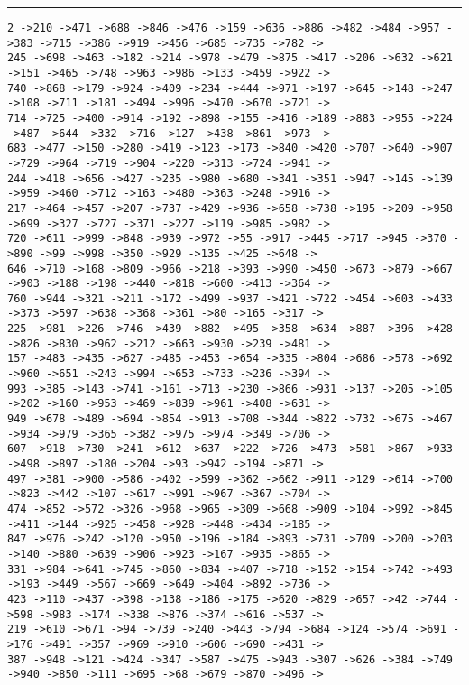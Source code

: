 \documentclass[letter, 12pt]{article}
\newenvironment{question}[1]{%
    \vspace{.2in}%
        \noindent{\bf #1}%
    \vspace{0.3em} \hrule \vspace{.1in}%
}{}
\begin{document}
\begin{question}{\large Appendix}
\begin{lstlisting}[style=CStyle]
2 ->210 ->471 ->688 ->846 ->476 ->159 ->636 ->886 ->482 ->484 ->957 ->383 ->715 ->386 ->919 ->456 ->685 ->735 ->782 ->
245 ->698 ->463 ->182 ->214 ->978 ->479 ->875 ->417 ->206 ->632 ->621 ->151 ->465 ->748 ->963 ->986 ->133 ->459 ->922 ->
740 ->868 ->179 ->924 ->409 ->234 ->444 ->971 ->197 ->645 ->148 ->247 ->108 ->711 ->181 ->494 ->996 ->470 ->670 ->721 ->
714 ->725 ->400 ->914 ->192 ->898 ->155 ->416 ->189 ->883 ->955 ->224 ->487 ->644 ->332 ->716 ->127 ->438 ->861 ->973 ->
683 ->477 ->150 ->280 ->419 ->123 ->173 ->840 ->420 ->707 ->640 ->907 ->729 ->964 ->719 ->904 ->220 ->313 ->724 ->941 ->
244 ->418 ->656 ->427 ->235 ->980 ->680 ->341 ->351 ->947 ->145 ->139 ->959 ->460 ->712 ->163 ->480 ->363 ->248 ->916 ->
217 ->464 ->457 ->207 ->737 ->429 ->936 ->658 ->738 ->195 ->209 ->958 ->699 ->327 ->727 ->371 ->227 ->119 ->985 ->982 ->
720 ->611 ->999 ->848 ->939 ->972 ->55 ->917 ->445 ->717 ->945 ->370 ->890 ->99 ->998 ->350 ->929 ->135 ->425 ->648 ->
646 ->710 ->168 ->809 ->966 ->218 ->393 ->990 ->450 ->673 ->879 ->667 ->903 ->188 ->198 ->440 ->818 ->600 ->413 ->364 ->
760 ->944 ->321 ->211 ->172 ->499 ->937 ->421 ->722 ->454 ->603 ->433 ->373 ->597 ->638 ->368 ->361 ->80 ->165 ->317 ->
225 ->981 ->226 ->746 ->439 ->882 ->495 ->358 ->634 ->887 ->396 ->428 ->826 ->830 ->962 ->212 ->663 ->930 ->239 ->481 ->
157 ->483 ->435 ->627 ->485 ->453 ->654 ->335 ->804 ->686 ->578 ->692 ->960 ->651 ->243 ->994 ->653 ->733 ->236 ->394 ->
993 ->385 ->143 ->741 ->161 ->713 ->230 ->866 ->931 ->137 ->205 ->105 ->202 ->160 ->953 ->469 ->839 ->961 ->408 ->631 ->
949 ->678 ->489 ->694 ->854 ->913 ->708 ->344 ->822 ->732 ->675 ->467 ->934 ->979 ->365 ->382 ->975 ->974 ->349 ->706 ->
607 ->918 ->730 ->241 ->612 ->637 ->222 ->726 ->473 ->581 ->867 ->933 ->498 ->897 ->180 ->204 ->93 ->942 ->194 ->871 ->
497 ->381 ->900 ->586 ->402 ->599 ->362 ->662 ->911 ->129 ->614 ->700 ->823 ->442 ->107 ->617 ->991 ->967 ->367 ->704 ->
474 ->852 ->572 ->326 ->968 ->965 ->309 ->668 ->909 ->104 ->992 ->845 ->411 ->144 ->925 ->458 ->928 ->448 ->434 ->185 ->
847 ->976 ->242 ->120 ->950 ->196 ->184 ->893 ->731 ->709 ->200 ->203 ->140 ->880 ->639 ->906 ->923 ->167 ->935 ->865 ->
331 ->984 ->641 ->745 ->860 ->834 ->407 ->718 ->152 ->154 ->742 ->493 ->193 ->449 ->567 ->669 ->649 ->404 ->892 ->736 ->
423 ->110 ->437 ->398 ->138 ->186 ->175 ->620 ->829 ->657 ->42 ->744 ->598 ->983 ->174 ->338 ->876 ->374 ->616 ->537 ->
219 ->610 ->671 ->94 ->739 ->240 ->443 ->794 ->684 ->124 ->574 ->691 ->176 ->491 ->357 ->969 ->910 ->606 ->690 ->431 ->
387 ->948 ->121 ->424 ->347 ->587 ->475 ->943 ->307 ->626 ->384 ->749 ->940 ->850 ->111 ->695 ->68 ->679 ->870 ->496 ->

\end{lstlisting}
\end{question}
\end{document}
